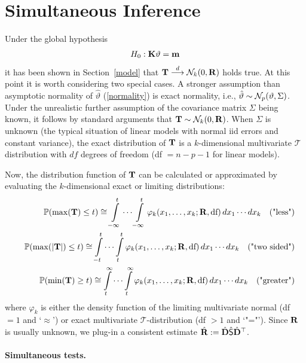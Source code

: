 \documentclass[12pt]{article}
\begin{document}
\section{Simultaneous Inference}

Under the global hypothesis
\begin{eqnarray*}
H_0: \mathbf{K} \vartheta = \mathbf{m}
\end{eqnarray*}
it has been shown in Section~\ref{model} that 
$\mathbf{T} \stackrel{d}{\longrightarrow} \mathcal{N}_k(0, \mathbf{R})$ holds true. At this point it is worth
considering two special cases. A stronger assumption than asymptotic normality
of $\hat{\vartheta}$ (\ref{normality}) is exact normality, i.e., 
$\hat{\vartheta} \sim \mathcal{N}_p(\vartheta, \Sigma)$. Under the unrealistic
further assumption of the covariance matrix $\Sigma$ being known, it
follows by standard arguments that $\mathbf{T} \sim \mathcal{N}_k(0, \mathbf{R})$. 
When $\Sigma$ is unknown (the typical situation of linear models
with normal iid errors and constant variance), the
exact distribution of $\mathbf{T}$ is a $k$-dimensional multivariate $\mathcal{T}$
distribution with $df$ degrees of freedom (df $ = n - p - 1$ for linear models).

Now, the distribution function of $\mathbf{T}$ can be calculated or approximated
by evaluating the $k$-dimensional exact or limiting distributions:
\begin{eqnarray*}
& & \mathbb{P}(\max(\mathbf{T}) \le t)  \cong\int\limits_{-\infty}^t \cdots \int\limits_{-\infty}^t 
\varphi_k(x_1, \dots, x_k; \mathbf{R}, \text{df}) \, dx_1 \cdots dx_k \quad \text{("less")}\\
& & \mathbb{P}(\max(|\mathbf{T}|) \le t)  \cong  \int\limits_{-t}^t \cdots \int\limits_{t}^t 
\varphi_k(x_1, \dots, x_k; \mathbf{R}, \text{df}) \, dx_1 \cdots dx_k \quad \text{("two sided")}\\
& & \mathbb{P}(\min(\mathbf{T}) \ge t) \cong  \int\limits_{t}^\infty \cdots \int\limits_{t}^\infty 
\varphi_k(x_1, \dots, x_k; \mathbf{R}, \text{df}) \, dx_1 \cdots dx_k \quad \text{("greater")}\\
\end{eqnarray*}
where $\varphi_k$ is either the density function of the limiting multivariate
normal (df $ = 1$ and `$\approx$') or exact multivariate $\mathcal{T}$-distribution (df $ > 1$
and `"="').
Since $\mathbf{R}$ is usually unknown, we plug-in a consistent estimate
$\hat{\mathbf{R}} := \hat{\mathbf{D}} \hat{\textsf{S}} \hat{\mathbf{D}}^\top$.

\paragraph{Simultaneous tests.}
\end{document}

